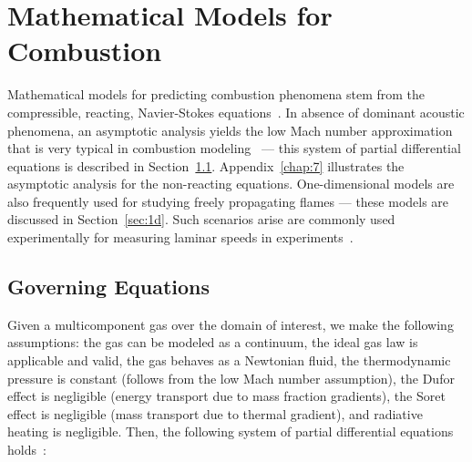 \chapter{Mathematical Models for Combustion}\label{chap:model}

Mathematical models for predicting combustion phenomena stem from the compressible, reacting, Navier-Stokes equations~\cite{PoinsotVeynante3ed}. In absence
of dominant acoustic phenomena, an asymptotic analysis yields the low Mach number approximation that is very typical in combustion modeling~\cite{Muller,Codina,PoinsotVeynante3ed,Kuo} --- this system of partial differential equations is described in Section~\ref{sec:lowmach}. Appendix~\ref{chap:7}
illustrates the asymptotic analysis for the non-reacting equations. One-dimensional models are
also frequently used for studying freely propagating flames --- these
models are discussed in Section~\ref{sec:1d}. Such
scenarios arise are commonly used experimentally for measuring laminar
speeds in experiments~\cite{Streng}.

\section{Governing Equations}\label{sec:lowmach}

Given a multicomponent gas over the domain of interest, we make the
following assumptions: the gas can be modeled as a continuum, the
ideal gas law is applicable and valid, the gas behaves as a Newtonian
fluid, the thermodynamic pressure
is constant (follows from the low Mach number assumption), the Dufor
effect is negligible (energy transport due to mass fraction gradients),
the Soret effect is negligible (mass transport due to thermal
gradient), and radiative heating is negligible. Then, the following system of partial differential
equations holds~\cite{PoinsotVeynante3ed}:

